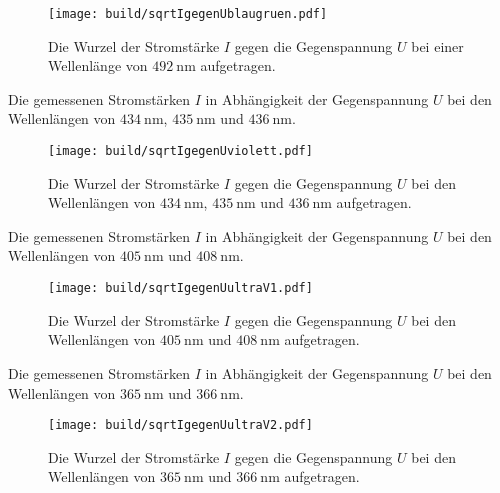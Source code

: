 \begin{figure}
	\centering
	\caption{Die Wurzel der Stromstärke $I$ gegen die Gegenspannung $U$ bei einer Wellenlänge von $\SI{492}{\nano\meter}$ aufgetragen.}
	\texttt{[image: build/sqrtIgegenUblaugruen.pdf]}
	\label{fig:Graphblaugruen}
\end{figure}
\begin{table}
	\centering
	\caption{Die gemessenen Stromstärken $I$ in Abhängigkeit der Gegenspannung $U$ bei den Wellenlängen von  $\SI{434}{\nano\meter}$, $\SI{435}{\nano\meter}$ und $ \SI{436}{\nano\meter}$.}
	
\end{table}
\begin{figure}
	\centering
	\caption{Die Wurzel der Stromstärke $I$ gegen die Gegenspannung $U$ bei den Wellenlängen von  $\SI{434}{\nano\meter}$, $\SI{435}{\nano\meter}$ und $ \SI{436}{\nano\meter}$ aufgetragen.}
	\texttt{[image: build/sqrtIgegenUviolett.pdf]}
	\label{fig:Graphviolett}
\end{figure}
\begin{table}
	\centering
	\caption{Die gemessenen Stromstärken $I$ in Abhängigkeit der Gegenspannung $U$ bei den Wellenlängen von $\SI{405}{\nano\meter}$ und $ \SI{408}{\nano\meter}$.}
	
\end{table}
\begin{figure}
	\centering
	\caption{Die Wurzel der Stromstärke $I$ gegen die Gegenspannung $U$ bei den Wellenlängen von $\SI{405}{\nano\meter}$ und $ \SI{408}{\nano\meter}$ aufgetragen.}
	\texttt{[image: build/sqrtIgegenUultraV1.pdf]}
	\label{fig:GraphultraV1}
\end{figure}
\begin{table}
	\centering
	\caption{Die gemessenen Stromstärken $I$ in Abhängigkeit der Gegenspannung $U$ bei den Wellenlängen von $\SI{365}{\nano\meter}$ und $ \SI{366}{\nano\meter}$.}
	
\end{table}
\begin{figure}
	\centering
	\caption{Die Wurzel der Stromstärke $I$ gegen die Gegenspannung $U$ bei den Wellenlängen von $\SI{365}{\nano\meter}$ und $ \SI{366}{\nano\meter}$ aufgetragen.}
	\texttt{[image: build/sqrtIgegenUultraV2.pdf]}
	\label{fig:GraphultraV2}
\end{figure}

